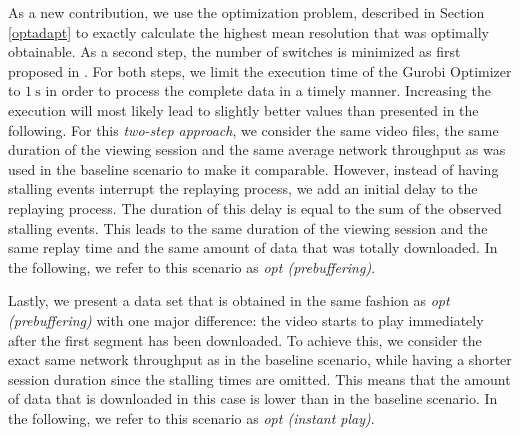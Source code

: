 As a new contribution, we use the optimization problem, described in Section \ref{optadapt} to exactly calculate the highest mean resolution that was optimally obtainable. As a second step, the number of switches is minimized as first proposed in \cite{miller2013optimal}. For both steps, we limit the execution time of the Gurobi Optimizer to $\SI{1}{\second}$ in order to process the complete data in a timely manner. Increasing the execution will most likely lead to slightly better values than presented in the following. For this \textit{two-step approach}, we consider the same video files, the same duration of the viewing session and the same average network throughput as was used in the baseline scenario to make it comparable. However, instead of having stalling events interrupt the replaying process, we add an initial delay to the replaying process. The duration of this delay is equal to the sum of the observed stalling events. This leads to the same duration of the viewing session and the same replay time and the same amount of data that was totally downloaded. In the following, we refer to this scenario as \textit{opt (prebuffering)}.

Lastly, we present a data set that is obtained in the same fashion as \textit{opt (prebuffering)} with one major difference: the video starts to play immediately after the first segment has been downloaded. To achieve this, we consider the exact same network throughput as in the baseline scenario, while having a shorter session duration since the stalling times are omitted. This means that the amount of data that is downloaded in this case is lower than in the baseline scenario. In the following, we refer to this scenario as \textit{opt (instant play)}.
